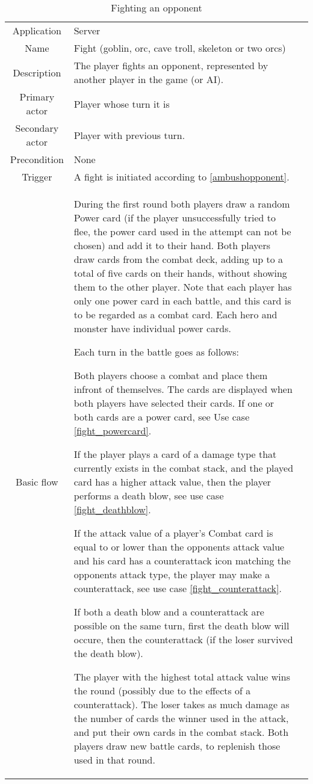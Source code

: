 \documentclass[a4paper,10pt]{report}
\begin{document}
\begin{table}
\caption{Fighting an opponent}
\label{fightopponent}
\begin{tabular}{|c| p{9cm}|c}
\hline
Application & Server & \\
Name & Fight (goblin, orc, cave troll, skeleton or two orcs) & \\
Description & The player fights an opponent, represented by another player in the game (or AI). & \\
Primary actor & Player whose turn it is & \\
Secondary actor & Player with previous turn. & \\
Precondition & None & \\
Trigger & A fight is initiated according to \ref{ambushopponent}. & \\ \hline
Basic flow & During the first round both players draw a random Power card (if the player unsuccessfully tried to flee, the power card used in the attempt can not be chosen) and add it to their hand. Both players draw cards from the combat deck, adding up to a total of five cards on their hands, without showing them to the other player. Note that each player has only one power card in each battle, and this card is to be regarded as a combat card. Each hero and monster have individual power cards.

Each turn in the battle goes as follows:

Both players choose a combat and place them infront of themselves. The cards are displayed when both players have selected their cards. If one or both cards are a power card, see Use case \ref{fight_powercard}.

If the player plays a card of a damage type that currently exists in the combat stack, and the played card has a higher attack value, then the player performs a death blow, see use case \ref{fight_deathblow}.

If the attack value of a player's Combat card is equal to or lower than the opponents attack value and his card has a counterattack icon matching the opponents attack type, the player may make a counterattack, see use case \ref{fight_counterattack}.

If both a death blow and a counterattack are possible on the same turn, first the death blow will occure, then the counterattack (if the loser survived the death blow).

The player with the highest total attack value wins the round (possibly due to the effects of a counterattack). The loser takes as much damage as the number of cards the winner used in the attack, and put their own cards in the combat stack. Both players draw new battle cards, to replenish those used in that round.


\end{tabular}
\end{table}
\end{document}
